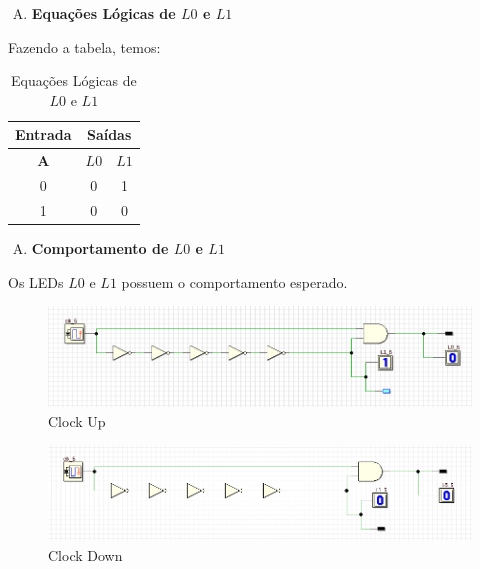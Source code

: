 \documentclass[12pt]{article}
\begin{document}
\begin{enumerate}[A)]
\item \textbf{Equações Lógicas de \(L0\) e \(L1\)}
\end{enumerate}

Fazendo a tabela, temos:

\begin{table}[H]
    \centering
    \caption{Equações Lógicas de \(L0\) e \(L1\)}
    \begin{tabular}{|c|c|c|}\hline
        \multicolumn{1}{|c|}{Entrada} & \multicolumn{2}{|c|}{Saídas} \\\hline
        \textbf{A} & \textbf{\(L0\)} & \textbf{\(L1\)} \\\hline
        0 & 0 & 1 \\\hline
        1 & 0 & 0 \\\hline
    \end{tabular}\label{tab:atraso_de_propagação:L0_L1}
\end{table}

\begin{enumerate}[B)]
\item \textbf{Comportamento de \(L0\) e \(L1\)}
\end{enumerate}

Os LEDs \(L0\) e \(L1\) possuem o comportamento esperado.

\begin{figure}[H]
    \centering
    \includegraphics[width=.9\textwidth]{Exp04/exp4_2.0_b_clk_up.png}
    \caption{Clock Up}\label{fig:exp4_2.0_b_clk_up.png}
\end{figure}

\begin{figure}[H]
    \centering
    \includegraphics[width=.9\textwidth]{Exp04/exp4_2.0_b_clk_down.png}
    \caption{Clock Down}\label{fig:exp4_2.0_b_clk_down.png}
\end{figure}
\end{document}
